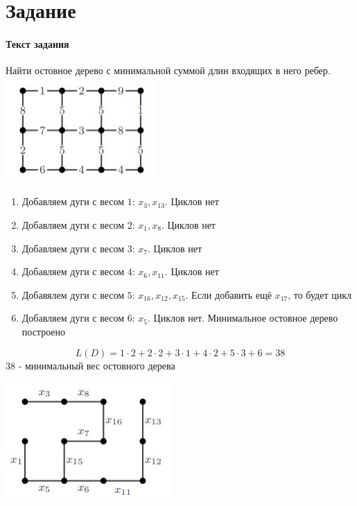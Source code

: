 \documentclass[a4paper, 12pt]{article}
\newcommand{\RNum}[1]{\uppercase\expandafter{\romannumeral #1\relax}}
\begin{document}
\section*{Задание \RNum{5}} 
\paragraph{Текст задания} Найти остовное дерево с минимальной суммой длин входящих в него ребер. %
\includegraphics{5_graph}
\begin{enumerate}
    \item Добавляем дуги с весом $1$: $x_3,x_{13}$. Циклов нет
    \item Добавляем дуги с весом $2$: $x_1, x_8$. Циклов нет
    \item Добавляем дуги с весом $3$: $x_7$. Циклов нет
    \item Добавляем дуги с весом $4$: $x_6, x_{11}$. Циклов нет
    \item Добавялем дуги с весом $5$: $x_{16}, x_{12}, x_{15}$. Если добавить ещё $x_{17}$, то будет цикл
    \item Добавляем дуги с весом $6$: $x_5$. Циклов нет. Минимальное остовное дерево построено
\end{enumerate}
$$ L(D) = 1\cdot2 + 2 \cdot 2 + 3 \cdot 1 + 4 \cdot 2 + 5 \cdot 3 + 6 = 38$$
38 - минимальный вес остовного дерева

\includegraphics{5_tree}
\end{document}
